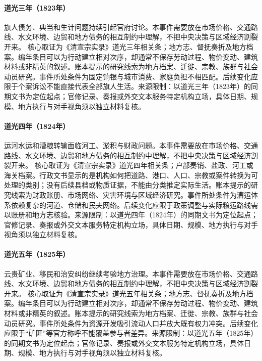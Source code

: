 \hypertarget{civic:EQ-1823-BANNER-DEBT}{}\paragraph{道光三年（1823年）}旗人债务、典当和生计问题持续引起官府讨论。本事件需要放在市场价格、交通路线、水文环境、边贸和地方债务的相互制约中理解，不把中央决策与区域经济割裂开来。 核心取证为《清宣宗实录》道光三年相关条；地方志、督抚奏折及地方档案。编年条目可以为行动建立相对次序，却通常不保存劳动过程、物价变动、建筑材料或非精英的叙述。账本提示的研究线索为地方档案、迁徙、宗教、族群与社会动员研究。事件所处条件为固定饷银与城市消费、家庭负担不相匹配。后续变化应限于个案诉讼不能直接代表全部旗人生活。来源限制：以道光三年（1823年）的同期文书为定位起点；官修记录、奏报或外交文本服务特定机构立场，具体日期、规模、地方执行与对手视角须以独立材料复核。
\hypertarget{civic:EQ-1824-GRAND-CANAL-CRISIS}{}\paragraph{道光四年（1824年）}运河水运和漕粮转输面临河工、淤积与财政问题。本事件需要放在市场价格、交通路线、水文环境、边贸和地方债务的相互制约中理解，不把中央决策与区域经济割裂开来。 核心取证为《清宣宗实录》道光四年相关条；户部奏销、盐政、河工或海关档案。行政文书显示的是机构如何把道路、港口、人口、宗教或案件转换为可处理的类别；没有后续县档或物质证据，不能由分类推定实际生活。账本提示的研究线索为财政账册、市场网络、灾害环境与区域经济研究。事件所处条件为漕运体系依赖复杂的河道、仓储和民夫网络。后续变化应限于政策调整与实际粮运路线需以账册和地方志核验。来源限制：以道光四年（1824年）的同期文书为定位起点；官修记录、奏报或外交文本服务特定机构立场，具体日期、规模、地方执行与对手视角须以独立材料复核。
\hypertarget{civic:EQ-1825-SOUTHWEST-MINING-UNREST}{}\paragraph{道光五年（1825年）}云贵矿业、移民和治安纠纷继续考验地方治理。本事件需要放在市场价格、交通路线、水文环境、边贸和地方债务的相互制约中理解，不把中央决策与区域经济割裂开来。 核心取证为《清宣宗实录》道光五年相关条；地方志、督抚奏折及地方档案。编年条目可以为行动建立相对次序，却通常不保存劳动过程、物价变动、建筑材料或非精英的叙述。账本提示的研究线索为地方档案、迁徙、宗教、族群与社会动员研究。事件所处条件为资源开发吸引流动人口并放大既有权力冲突。后续变化应限于“矿匪”等官方称呼不能覆盖参与者差异。来源限制：以道光五年（1825年）的同期文书为定位起点；官修记录、奏报或外交文本服务特定机构立场，具体日期、规模、地方执行与对手视角须以独立材料复核。
